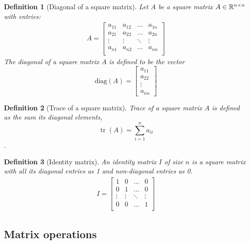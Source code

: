 \documentclass[twocolumn]{article}
\newtheorem{defn}{Definition}
\DeclareMathOperator{\tr}{tr}
\begin{document}
\begin{defn}[Diagonal of a square matrix]
  Let $A$ be a square matrix $A \in \mathbb{R}^{n \times n}$  with   entries:
  \begin{align}
    A  =  \begin{bmatrix}
      a_{11}  &  a_{12} &   \dots &  a_{1n} \\
      a_{21}  &  a_{22} &   \dots &  a_{2n} \\
      \vdots  & \vdots &   \ddots  &  \vdots   \\
      a_{n1}  &  a_{n2} &   \dots &  a_{nn} \\
    \end{bmatrix}
  \end{align}
  The diagonal of a square matrix  $A$ is defined  to be the vector
  \[  \text{diag}(A)= \begin{bmatrix} a_{11} \\   a_{22} \\ \vdots  \\ a_{nn} \end{bmatrix}\]
\end{defn}


\begin{defn}[Trace of a square matrix]
  Trace  of a square matrix  $A$ is defined as the sum its diagonal elements,
  \[ \tr(A) = \sum_{i=1}^n a_{ii} \].
\end{defn}

\begin{defn}[Identity matrix]
  An identity matrix $I$ of size $n$ is  a square matrix with all its diagonal
  entries as 1 and non-diagonal entries as 0.
  \begin{align}
    I  =  \begin{bmatrix}
      1 & 0 & \dots & 0   \\
      0 & 1 & \dots & 0   \\
      \vdots   & \vdots &  \ddots  & \vdots \\
      0 & 0 & \dots & 1   \\
      \end{bmatrix}
    \end{align}
\end{defn}


\subsection{Matrix operations}
\end{document}

